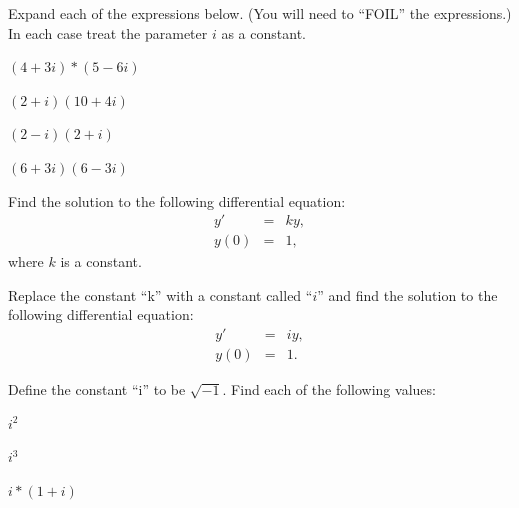 

\begin{problem}
\item Expand each of the expressions below. (You will need to ``FOIL''
  the expressions.) In each case treat the parameter $i$ as a
  constant.

  \begin{subproblem}
  \item $(4+3i)*(5-6i)$
    \vfill

  \item $(2+i)(10+4i)$
    \vfill
      
  \item $(2-i)(2+i)$
    \vfill

  \item $(6+3i)(6-3i)$
    \vfill

  \end{subproblem}
\end{problem}



  \begin{problem}
  \item Find the solution to the following differential equation:
    \begin{eqnarray*}
      y' & = & k y, \\
      y(0) & = & 1,
    \end{eqnarray*}
    where $k$ is a constant.
    \vfill

  \item Replace the constant ``k'' with a constant called ``$i$'' and
    find the solution to the following differential equation:
    \begin{eqnarray*}
      y' & = & i y, \\
      y(0) & = & 1.
    \end{eqnarray*}
    \label{problem:firstLookEulerFormula}
    \vfill


    \clearpage
  \item Define the constant ``i'' to be $\sqrt{-1}$. Find each of the
    following values:

    \begin{subproblem}
      \item $i^2$
        \vfill
      \item $i^3$
        \vfill
      \item $i*(1+i)$
        \vfill
    \end{subproblem}

  \end{problem}



